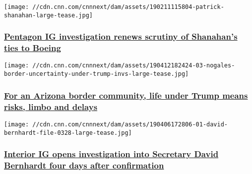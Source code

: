 \href{/2019/03/21/politics/pentagon-patrick-shanahan-boeing/index.html}{}

\texttt{[image: //cdn.cnn.com/cnnnext/dam/assets/190211115804-patrick-shanahan-large-tease.jpg]}

\hypertarget{pentagon-ig-investigation-renews-scrutiny-of-shanahans-ties-to-boeing}{%
\subsubsection{\texorpdfstring{\href{/2019/03/21/politics/pentagon-patrick-shanahan-boeing/index.html}{Pentagon
IG investigation renews scrutiny of Shanahan's ties to
Boeing}}{Pentagon IG investigation renews scrutiny of Shanahan's ties to Boeing}}\label{pentagon-ig-investigation-renews-scrutiny-of-shanahans-ties-to-boeing}}

\href{/2019/04/15/us/nogales-border-uncertainty-under-trump-invs/index.html}{}

\texttt{[image: //cdn.cnn.com/cnnnext/dam/assets/190412182424-03-nogales-border-uncertainty-under-trump-invs-large-tease.jpg]}

\hypertarget{for-an-arizona-border-community-life-under-trump-means-risks-limbo-and-delays}{%
\subsubsection{\texorpdfstring{\href{/2019/04/15/us/nogales-border-uncertainty-under-trump-invs/index.html}{For
an Arizona border community, life under Trump means risks, limbo and
delays}}{For an Arizona border community, life under Trump means risks, limbo and delays}}\label{for-an-arizona-border-community-life-under-trump-means-risks-limbo-and-delays}}

\href{/2019/04/15/politics/bernhardt-interior-ig-investigation/index.html}{}

\texttt{[image: //cdn.cnn.com/cnnnext/dam/assets/190406172806-01-david-bernhardt-file-0328-large-tease.jpg]}

\hypertarget{interior-ig-opens-investigation-into-secretary-david-bernhardt-four-days-after-confirmation-}{%
\subsubsection{\texorpdfstring{\href{/2019/04/15/politics/bernhardt-interior-ig-investigation/index.html}{Interior
IG opens investigation into Secretary David Bernhardt four days after
confirmation
}}{Interior IG opens investigation into Secretary David Bernhardt four days after confirmation }}\label{interior-ig-opens-investigation-into-secretary-david-bernhardt-four-days-after-confirmation-}}

